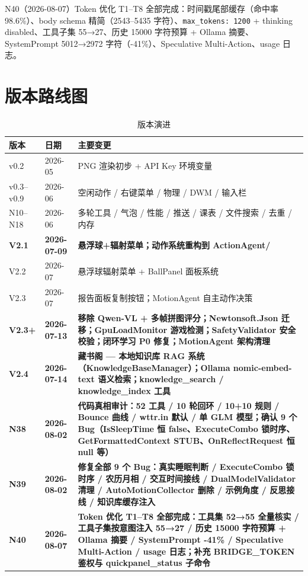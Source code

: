 \documentclass[12pt,a4paper]{ctexart}
\begin{document}
N40（2026-08-07）Token 优化 T1--T8 全部完成：时间戳尾部缓存（命中率 98.6\%）、body schema 精简（2543--5435 字符）、\texttt{max\_tokens: 1200} + thinking disabled、工具子集 55→27、历史 15000 字符预算 + Ollama 摘要、SystemPrompt 5012→2972 字符（-41\%）、Speculative Multi-Action、usage 日志。

\section{版本路线图}

\begin{table}[H]
\centering
\caption{版本演进}
\label{tab:versions}
\begin{tabular}{llp{7cm}}
\toprule
\textbf{版本} & \textbf{日期} & \textbf{主要变更} \\
\midrule
v0.2 & 2026-05 & PNG 渲染初步 + API Key 环境变量 \\
v0.3--v0.9 & 2026-06 & 空闲动作 / 右键菜单 / 物理 / DWM / 输入栏 \\
N10--N18 & 2026-06 & 多轮工具 / 气泡 / 性能 / 推送 / 课表 / 文件搜索 / 去重 / 内存 \\
\textbf{V2.1} & \textbf{2026-07-09} & \textbf{悬浮球+辐射菜单；动作系统重构到 ActionAgent/} \\
V2.2 & 2026-07 & 悬浮球辐射菜单 + BallPanel 面板系统 \\
V2.3 & 2026-07 & 报告面板复制按钮；MotionAgent 自主动作决策 \\
\textbf{V2.3+} & \textbf{2026-07-13} & \textbf{移除 Qwen-VL + 多帧拼图评分；Newtonsoft.Json 迁移；GpuLoadMonitor 游戏检测；SafetyValidator 安全校验；闭环学习 P0 修复；MotionAgent 架构清理} \\
\textbf{V2.4} & \textbf{2026-07-14} & \textbf{藏书阁 — 本地知识库 RAG 系统（KnowledgeBaseManager）；Ollama nomic-embed-text 语义检索；knowledge\_search / knowledge\_index 工具} \\
\textbf{N38} & \textbf{2026-08-02} & \textbf{代码真相审计：52 工具 / 10 轮回环 / 10+10 规则 / Bounce 曲线 / wttr.in 默认 / 单 GLM 模型；确认 9 个 Bug（IsSleepTime 恒 false、ExecuteCombo 锁时序、GetFormattedContext STUB、OnReflectRequest 恒 null 等）} \\
\textbf{N39} & \textbf{2026-08-02} & \textbf{修复全部 9 个 Bug：真实睡眠判断 / ExecuteCombo 锁时序 / 农历月相 / 交互时间接线 / DualModelValidator 清理 / AutoMotionCollector 删除 / 示例角度 / 反思接线 / 知识库缓存注入} \\
\textbf{N40} & \textbf{2026-08-07} & \textbf{Token 优化 T1--T8 全部完成：工具集 52→55 全量核实 / 工具子集按意图注入 55→27 / 历史 15000 字符预算 + Ollama 摘要 / SystemPrompt -41\% / Speculative Multi-Action / usage 日志；补充 BRIDGE\_TOKEN 鉴权与 quickpanel\_status 子命令} \\
\bottomrule
\end{tabular}
\end{table}
\end{document}
